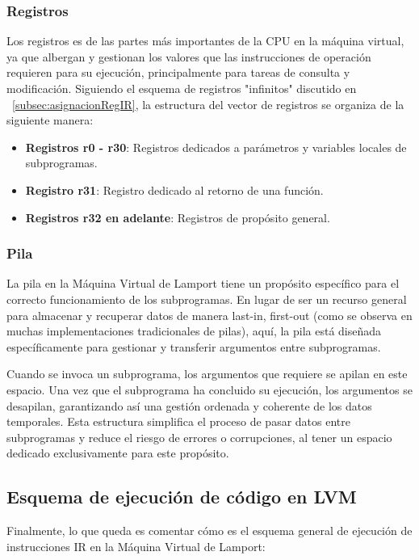 \subsubsection{Registros}\label{subsubsec:registrosLVM}
Los registros es de las partes más importantes de la CPU en la máquina virtual, ya que albergan y gestionan los valores que las instrucciones de operación requieren para su ejecución, principalmente para tareas de consulta y modificación. Siguiendo el esquema de registros "infinitos" discutido en ~\ref{subsec:asignacionRegIR}, la estructura del vector de registros se organiza de la siguiente manera:
\begin{itemize}
    \item \textbf{Registros r0 - r30}: Registros dedicados a parámetros y variables locales de subprogramas.
    \item \textbf{Registro r31}: Registro dedicado al retorno de una función.
    \item \textbf{Registros r32 en adelante}: Registros de propósito general.
\end{itemize}

\subsubsection{Pila}\label{subsubsec:pilaLVM}
La pila en la Máquina Virtual de Lamport tiene un propósito específico para el correcto funcionamiento de los subprogramas. En lugar de ser un recurso general para almacenar y recuperar datos de manera last-in, first-out (como se observa en muchas implementaciones tradicionales de pilas), aquí, la pila está diseñada específicamente para gestionar y transferir argumentos entre subprogramas.

\vspace{0.5cm}

Cuando se invoca un subprograma, los argumentos que requiere se apilan en este espacio. Una vez que el subprograma ha concluido su ejecución, los argumentos se desapilan, garantizando así una gestión ordenada y coherente de los datos temporales. Esta estructura simplifica el proceso de pasar datos entre subprogramas y reduce el riesgo de errores o corrupciones, al tener un espacio dedicado exclusivamente para este propósito.

\subsection{Esquema de ejecución de código en LVM}
Finalmente, lo que queda es comentar cómo es el esquema general de ejecución de instrucciones IR en la Máquina Virtual de Lamport:

